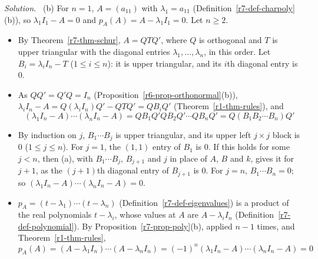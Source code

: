 \documentclass[12pt]{article}
\theoremstyle{definition}
\newenvironment{solution}{\par\noindent\textit{Solution.}\ }{\par\smallskip}
\begin{document}
\begin{solution}
(b) For \(n=1\), \(A=(a_{11})\) with \(\lambda_1=a_{11}\) (Definition~\ref{r7-def-charpoly}(b)), so
\(\lambda_1I_1-A=0\) and \(p_A(A)=A-\lambda_1I_1=0\). Let \(n\geqslant2\).
\begin{itemize}
\item By Theorem~\ref{r7-thm-schur}, \(A=QTQ'\), where \(Q\) is orthogonal and \(T\) is upper triangular with the
diagonal entries \(\lambda_1,\dots,\lambda_n\), in this order. Let \(B_i=\lambda_iI_n-T\) (\(1\leqslant i\leqslant n\)): it
is upper triangular, and its \(i\)th diagonal entry is \(0\).
\item As \(QQ'=Q'Q=I_n\) (Proposition~\ref{r6-prop-orthonormal}(b)), \(\lambda_iI_n-A=Q(\lambda_iI_n)Q'-QTQ'=QB_iQ'\)
(Theorem~\ref{r1-thm-rules}), and
\[
(\lambda_1I_n-A)\cdots(\lambda_nI_n-A)=QB_1Q'QB_2Q'\cdots QB_nQ'=Q(B_1B_2\cdots B_n)Q'
\]
\item By induction on \(j\), \(B_1\cdots B_j\) is upper triangular, and its upper left \(j\times j\) block is \(0\)
(\(1\leqslant j\leqslant n\)). For \(j=1\), the \((1,1)\) entry of \(B_1\) is \(0\). If this holds for some \(j<n\), then
(a), with \(B_1\cdots B_j\), \(B_{j+1}\) and \(j\) in place of \(A\), \(B\) and \(k\), gives it for \(j+1\), as the
\((j+1)\)th diagonal entry of \(B_{j+1}\) is \(0\). For \(j=n\), \(B_1\cdots B_n=0\); so
\((\lambda_1I_n-A)\cdots(\lambda_nI_n-A)=0\).
\item \(p_A=(t-\lambda_1)\cdots(t-\lambda_n)\) (Definition~\ref{r7-def-eigenvalues}) is a product of the real polynomials
\(t-\lambda_i\), whose values at \(A\) are \(A-\lambda_iI_n\) (Definition~\ref{r7-def-polynomial}). By
Proposition~\ref{r7-prop-poly}(b), applied \(n-1\) times, and Theorem~\ref{r1-thm-rules},
\[
p_A(A)=(A-\lambda_1I_n)\cdots(A-\lambda_nI_n)=(-1)^n(\lambda_1I_n-A)\cdots(\lambda_nI_n-A)=0
\]
\end{itemize}
\end{solution}
\end{document}
